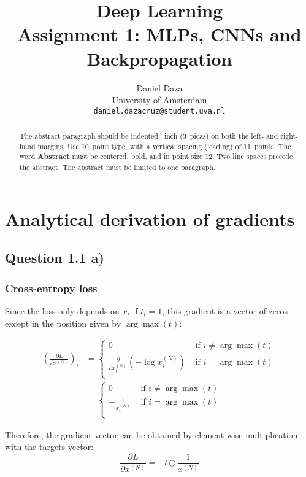 \documentclass{article}
\title{Deep Learning\\Assignment 1: MLPs, CNNs and Backpropagation}
\author{%
  Daniel Daza\\
  University of Amsterdam\\
  \texttt{daniel.dazacruz@student.uva.nl} \\
}
\begin{document}

\maketitle

\begin{abstract}
  The abstract paragraph should be indented ~inch (3~picas) on
  both the left- and right-hand margins. Use 10~point type, with a vertical
  spacing (leading) of 11~points.  The word \textbf{Abstract} must be centered,
  bold, and in point size 12. Two line spaces precede the abstract. The abstract
  must be limited to one paragraph.
\end{abstract}

\section{Analytical derivation of gradients}

\subsection*{Question 1.1 a)}

\subsubsection*{Cross-entropy loss}

Since the loss only depends on $x_i$ if $t_i = 1$, this gradient is a vector of zeros except in the position given by $\arg\max(t)$:

\begin{align}
\left(\frac{\partial L}{\partial x^{(N)}} \right)_i &=
\left\lbrace
\begin{matrix}
0 &\text{ if } i \neq \arg\max(t)\\
\frac{\partial}{\partial x_i^{(N)}}\left(-\log x_i^{(N)}\right) &\text{ if } i = \arg\max(t)\\
\end{matrix}
\right.\\
&= \left\lbrace
\begin{matrix}
0 &\text{ if } i \neq \arg\max(t)\\
-\frac{1}{x_i^{(N)}} &\text{ if } i = \arg\max(t)\\
\end{matrix}
\right.
\end{align}


Therefore, the gradient vector can be obtained by element-wise multiplication with the targets vector:
\begin{equation}
\frac{\partial L}{\partial x^{(N)}} = -t\odot\frac{1}{x^{(N)}}
\end{equation}
\end{document}
